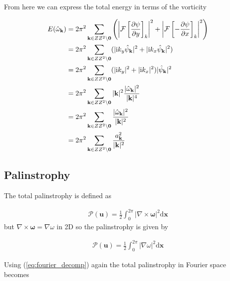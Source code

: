 \documentclass[9pt]{article}
\newcommand{\pder}[2]{\frac{\partial #1}{\partial #2}}               %
\newcommand{\ii}{\mathrm{i}}      								  %
\newcommand{\grad}[1]{\nabla{#1}}								%
\newcommand{\curl}[1]{\nabla \times {#1}}								%
\newcommand{\bfu}{\mathbf{u}}											%
\newcommand{\bfx}{\mathbf{x}}								%
\newcommand{\bfk}{\mathbf{k}}								%
\begin{document}
From here we can express the total energy in terms of the vorticity 

\begin{align}
E(\hat{\omega}_{\bfk}) &=  2\pi^2 \sum_{\mathbf{k}\in \mathbb{Z}^2\setminus \mathbf{0}} \left(\left|\mathcal{F}\left[\pder{\psi}{y}\right]_k\right|^2 + \left|\mathcal{F}\left[-\pder{\psi}{x}\right]_k\right|^2 \right) \notag \\
&= 2\pi^2 \sum_{\mathbf{k}\in \mathbb{Z}^2\setminus \mathbf{0}} (|\ii k_{y}\hat{\psi}_{\mathbf{k}}|^2 + |\ii k_x \hat{\psi}_{\mathbf{k}}|^2) \notag \\
&= 2\pi^2 \sum_{\mathbf{k}\in \mathbb{Z}^2\setminus \mathbf{0}} (|\ii k_{y}|^2 + |\ii k_x|^2)|\hat{\psi}_{\mathbf{k}}|^2 \notag \\
&= 2\pi^2 \sum_{\mathbf{k}\in \mathbb{Z}^2\setminus \mathbf{0}} |\bfk|^2\frac{|\hat{\omega}_{\mathbf{k}}|^2}{|\bfk|^4} \notag \\
&= 2\pi^2 \sum_{\mathbf{k}\in \mathbb{Z}^2\setminus \mathbf{0}} \frac{|\hat{\omega}_{\mathbf{k}}|^2}{|\bfk|^2} \notag \\
&= 2\pi^2 \sum_{\mathbf{k}\in \mathbb{Z}^2\setminus \mathbf{0}} \frac{a_{\mathbf{k}}^2}{|\bfk|^2}
\label{eq:energy_w_fourier}
\end{align}

\subsection{Palinstrophy}

 The total palinstrophy is defined as 

 \begin{align}
 \mathcal{P}(\bfu) = \frac{1}{2}\int_0^{2\pi} |\curl{\bm{\omega}}|^2\mathrm{d}\bfx
 \end{align}	
but $\curl{\bm{\omega}} = \grad{\omega}$ in 2D so the palinstrophy is given by

\begin{align}
\mathcal{P}(\bfu) = \frac{1}{2}\int_0^{2\pi} |\grad{\omega}|^2\mathrm{d}\bfx
\end{align}

Using (\ref{eq:fourier_decomp}) again the total palinstrophy in Fourier space becomes
\end{document}
